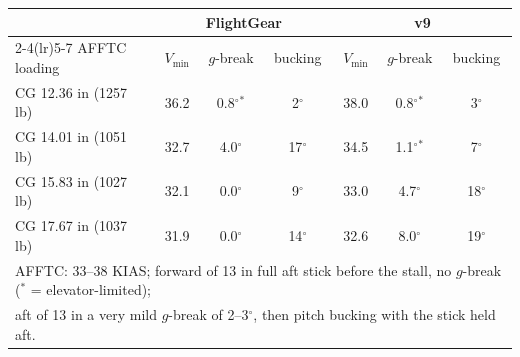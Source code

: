 \begin{tabular}{lcccccc}
\toprule
 & \multicolumn{3}{c}{FlightGear} & \multicolumn{3}{c}{v9} \\
\cmidrule(lr){2-4}\cmidrule(lr){5-7}
AFFTC loading & $V_{\min}$ & $g$-break & bucking & $V_{\min}$ & $g$-break & bucking \\
\midrule
CG 12.36 in (1257 lb) & 36.2 & 0.8$^\circ$$^\ast$ & 2$^\circ$ & 38.0 & 0.8$^\circ$$^\ast$ & 3$^\circ$ \\
CG 14.01 in (1051 lb) & 32.7 & 4.0$^\circ$ & 17$^\circ$ & 34.5 & 1.1$^\circ$$^\ast$ & 7$^\circ$ \\
CG 15.83 in (1027 lb) & 32.1 & 0.0$^\circ$ & 9$^\circ$ & 33.0 & 4.7$^\circ$ & 18$^\circ$ \\
CG 17.67 in (1037 lb) & 31.9 & 0.0$^\circ$ & 14$^\circ$ & 32.6 & 8.0$^\circ$ & 19$^\circ$ \\
\midrule
\multicolumn{7}{l}{AFFTC: 33--38 KIAS; forward of 13 in full aft stick before the stall, no $g$-break ($^\ast$ = elevator-limited);}\\
\multicolumn{7}{l}{aft of 13 in a very mild $g$-break of 2--3$^\circ$, then pitch bucking with the stick held aft.}\\
\bottomrule
\end{tabular}
